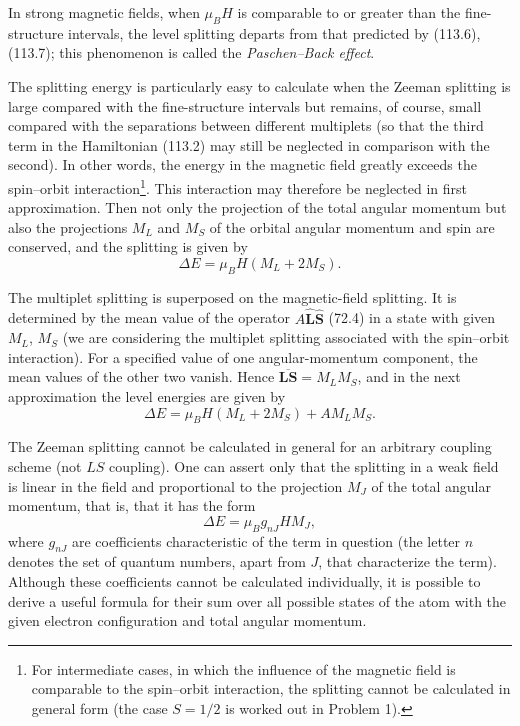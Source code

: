 In strong magnetic fields, when $\mu_BH$ is comparable to or greater than the fine-structure intervals, the level splitting departs from that predicted by (113.6), (113.7); this phenomenon is called the \emph{Paschen--Back effect}.

The splitting energy is particularly easy to calculate when the Zeeman splitting is large compared with the fine-structure intervals but remains, of course, small compared with the separations between different multiplets (so that the third term in the Hamiltonian (113.2) may still be neglected in comparison with the second). In other words, the energy in the magnetic field greatly exceeds the spin--orbit interaction\footnote{For intermediate cases, in which the influence of the magnetic field is comparable to the spin--orbit interaction, the splitting cannot be calculated in general form (the case $S=1/2$ is worked out in Problem 1).}. This interaction may therefore be neglected in first approximation. Then not only the projection of the total angular momentum but also the projections $M_L$ and $M_S$ of the orbital angular momentum and spin are conserved, and the splitting is given by
\begin{equation}
 \Delta E=\mu_BH(M_L+2M_S).
 \tag{113.13}
\end{equation}

The multiplet splitting is superposed on the magnetic-field splitting. It is determined by the mean value of the operator $A\hat{\mathbf L}\hat{\mathbf S}$ (72.4) in a state with given $M_L$, $M_S$ (we are considering the multiplet splitting associated with the spin--orbit interaction). For a specified value of one angular-momentum component, the mean values of the other two vanish. Hence $\overline{\mathbf L\mathbf S}=M_LM_S$, and in the next approximation the level energies are given by
\begin{equation}
 \Delta E=\mu_BH(M_L+2M_S)+AM_LM_S.
 \tag{113.14}
\end{equation}

The Zeeman splitting cannot be calculated in general for an arbitrary coupling scheme (not $LS$ coupling). One can assert only that the splitting in a weak field is linear in the field and proportional to the projection $M_J$ of the total angular momentum, that is, that it has the form
\begin{equation}
 \Delta E=\mu_Bg_{nJ}HM_J,
 \tag{113.15}
\end{equation}
where $g_{nJ}$ are coefficients characteristic of the term in question (the letter $n$ denotes the set of quantum numbers, apart from $J$, that characterize the term). Although these coefficients cannot be calculated individually, it is possible to derive a useful formula for their sum over all possible states of the atom with the given electron configuration and total angular momentum.

